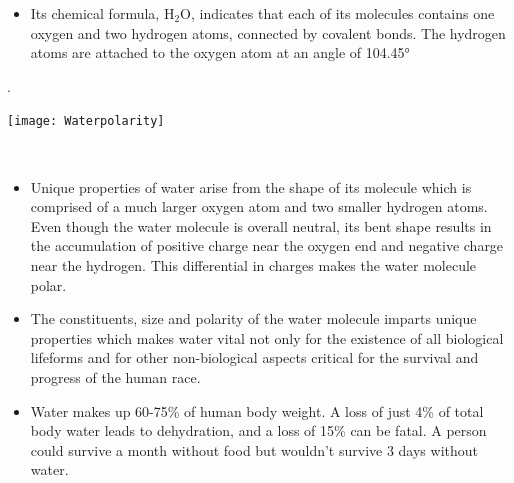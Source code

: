 %

\begin{minipage}{.7\textwidth} 
\begin{itemize}
\item Its chemical formula, H$_2$O, indicates that each of its molecules contains one oxygen and two hydrogen atoms, connected by covalent bonds. The hydrogen atoms are attached to the oxygen atom at an angle of 104.45\si{\degree}
\end{itemize}.
    \end{minipage}%
        \begin{minipage}{0.3\textwidth}
        \centering
        \texttt{[image: Waterpolarity]}
    \end{minipage}\\
\vspace{0.5cm}
\begin{itemize}
\item Unique properties of water arise from the shape of its molecule which is comprised of a much larger oxygen atom and two smaller hydrogen atoms.  Even though the water molecule is overall neutral, its bent shape results in the accumulation of positive charge near the oxygen end and negative charge near the hydrogen.  This differential in charges makes the water molecule polar. 

\item The constituents, size and polarity of the water molecule imparts unique properties which makes water vital not only for the existence of all biological lifeforms and for other non-biological aspects critical for the survival and progress of the human race.

\item Water makes up 60-75\% of human body weight. A loss of just 4\% of total body water leads to dehydration, and a loss of 15\% can be fatal. A person could survive a month without food but wouldn’t survive 3 days without water.\\
\end{itemize}

